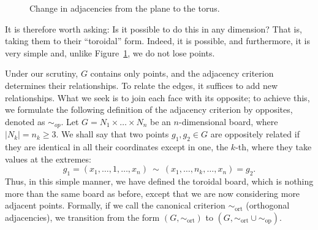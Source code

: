 \begin{figure}[H]
\begin{center}
	\end{center}
	\caption{Change in adjacencies from the plane to the torus.}
	\label{fig:Fig 27} %
\end{figure}
It is therefore worth asking: Is it possible to do this in any dimension? That is, taking them to their ``toroidal'' form. Indeed, it is possible, and furthermore, it is very simple and, unlike Figure~\ref{fig:Fig 27}, we do not lose points.

Under our scrutiny, $G$ contains only points, and the adjacency criterion determines their relationships. To relate the edges, it suffices to add new relationships. What we seek is to join each face with its opposite; to achieve this, we formulate the following definition of the adjacency criterion by opposites, denoted as \(\sim_{op}\). Let \(G = N_1 \times \dots \times N_n\) be an $n$-dimensional board, where \(|N_k| = n_k \ge 3\). We shall say that two points $g_1, g_2 \in G$ are oppositely related if they are identical in all their coordinates except in one, the $k$-th, where they take values at the extremes:
\begin{equation*}
	g_1=(x_1,\dots, 1, \dots, x_n) \ \sim \ (x_1, \dots, n_k, \dots, x_n)=g_2.
\end{equation*}
Thus, in this simple manner, we have defined the toroidal board, which is nothing more than the same board as before, except that we are now considering more adjacent points. Formally, if we call the canonical criterion \(\sim_{\text{ort}}\) (orthogonal adjacencies), we transition from the form \((G,\sim_{\text{ort}})\) to $(G, \sim_{\text{ort}} \cup \sim_{\text{op}})$.

